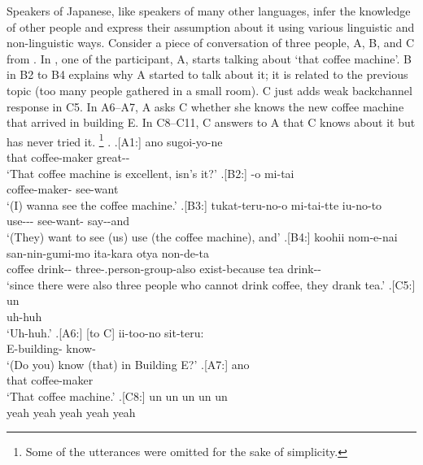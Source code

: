 Speakers of Japanese, like speakers of many other languages,
infer the knowledge of other people and
express their assumption about it using various linguistic and non-linguistic ways.
Consider a piece of conversation of three people, A, B, and C
from  \cite{Den_2007_SAC}.
In \Next[-A1],
one of the participant, A, starts talking about  `that coffee machine'.
B in B2 to B4 explains why A started to talk about it;
it is related to the previous topic (too many people gathered in a small room).
C just adds weak backchannel response in C5.
In A6--A7,
A asks C whether she knows the new coffee machine that arrived in building E.
In C8--C11,
C answers to A that
C knows about it but has never tried it.%
	\footnote{
	Some of the utterances were omitted for the sake of simplicity.
	}
%
\ex.
 \ag.[A1:] ano  sugoi-yo-ne \\
      that coffee-maker great-- \\
      `That coffee machine is excellent, isn's it?'
 \bg.[B2:] -o mi-tai \\
          coffee-maker- see-want \\
          `(I) wanna see the coffee machine.'
 \bg.[B3:] tukat-teru-no-o mi-tai-tte iu-no-to \\
           use--- see-want- say--and \\
           `(They) want to see (us) use (the coffee machine), and'
 \bg.[B4:] koohii nom-e-nai san-nin-gumi-mo ita-kara otya non-de-ta \\
           coffee drink-- three-.person-group-also exist-because tea drink-- \\
           `since there were also three people who cannot drink coffee, they drank tea.'
 \bg.[C5:] un \\
           uh-huh \\
           `Uh-huh.'
 \bg.[A6:] [to C] ii-too-no sit-teru: \\
           {} {} E-building- know- \\
           `(Do you) know (that) in Building E?'
 \bg.[A7:] ano  \\
           that coffee-maker \\
           `That coffee machine.'
 \bg.[C8:] un un un un un \\
           yeah yeah yeah yeah yeah \\
